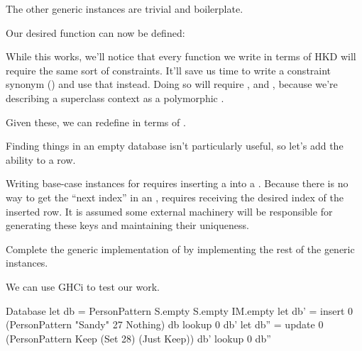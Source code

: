 \documentclass[book.tex]{subfiles}
\begin{document}
The other generic instances are trivial and boilerplate.


Our desired  function can now be defined:


While this works, we'll notice that every function we write in terms of HKD will
require the same sort of constraints. It'll save us time to write a constraint
synonym () and use that instead. Doing so will
require ,  and
, because we're describing a superclass context as a
polymorphic  .


Given these, we can redefine  in terms of .


Finding things in an empty database isn't particularly useful, so let's add the
ability to  a row.


Writing base-case instances for  requires inserting a  into a . Because there is no way to get
the ``next index'' in an ,  requires receiving the
desired index of the inserted row. It is assumed some external machinery will be
responsible for generating these keys and maintaining their uniqueness.


\begin{exercise}
Complete the generic implementation of  by implementing
the rest of the generic instances.
\end{exercise}
\begin{solution}
\end{solution}

We can use GHCi to test our work.

\begin{dorepl}{Database}
let db = PersonPattern S.empty S.empty IM.empty
let db' = insert 0 (PersonPattern "Sandy" 27 Nothing) db
lookup 0 db'
let db'' = update 0 (PersonPattern Keep (Set 28) (Just Keep)) db'
lookup 0 db''
\end{dorepl}
\end{document}
